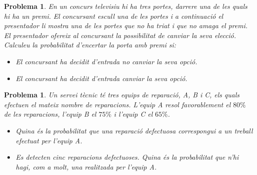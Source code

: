 \documentclass[11pt]{article}
\newcounter{prbcont}
\newtheorem{problema}[prbcont]{Problema}
\begin{document}
\begin{problema}
En un concurs televisiu hi ha tres portes, darrere una de les quals hi ha un premi. El
concursant escull una de les portes i a continuaci\'o el presentador li mostra una de les
portes que no ha triat i que no amaga el premi. El presentador ofereix al concursant la
possibilitat de canviar la seva elecci\'o. Calculeu la probabilitat d'encertar la porta amb
premi si:
\begin{itemize}
\item [(a)] El concursant ha decidit d'entrada no canviar la seva opci\'o.
\item [(b)] El concursant ha decidit d'entrada canviar la seva opci\'o. 
\end{itemize}
\end{problema}


\begin{problema}
Un servei t\`ecnic t\'e tres equips de reparaci\'o, A, B i C, els quals efectuen el mateix nombre
de reparacions. L'equip A resol favorablement el $80\%$ de les reparacions, l'equip B el $75\%$
i l'equip C el $65\%$.
\begin{itemize}
\item [(a)] Quina \'es la probabilitat que una reparaci\'o defectuosa correspongui a un treball efectuat
per l'equip A.
\item [(b)] Es detecten cinc reparacions defectuoses. Quina \'es la probabilitat que n'hi hagi, com
a molt, una realitzada per l'equip A.
\end{itemize}
\end{problema}
\end{document}
